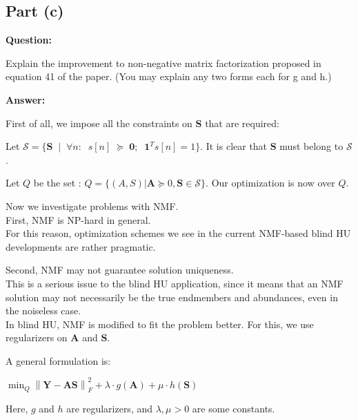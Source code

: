 \documentclass[fleqn, 11pt]{article}
\newcommand{\bs}[1]{\boldsymbol{#1}}
\newcommand\norm[1]{\left\lVert#1\right\rVert}
\begin{document}
\bigskip


\subsection*{Part (c)}

\textbf{Question:}

\smallskip

Explain the improvement to non-negative matrix factorization proposed in equation 41 of the paper.
(You may explain any two forms each for g and h.)

\hrulefill

\medskip

\textbf{Answer:}

\smallskip

First of all, we impose all the constraints on $\bs{S}$ that are required:

Let $\mathcal{S}=\{ \bs{S} \;\; | \;\; \forall n:  \;\; s[n] \; \succeq \; \bs{0} ;  \;\; \bs{1}^Ts[n]=1 \}$. 
It is clear that $\bs{S}$ must belong to $\mathcal{S}$. 

\medskip

Let $Q$ be the set : $Q = \{ (A,S) |  \bs{A} \succeq {0}, \bs{S} \in \mathcal{S}\}$.
Our optimization is now over $Q$. 

\medskip

Now we investigate problems with NMF. \\

First, NMF is NP-hard in general. \\
For this reason, optimization schemes we see in the current NMF-based blind HU developments are rather pragmatic.

Second, NMF may not guarantee solution uniqueness. \\
This is a serious issue to the blind HU application, since it means that an NMF solution may not necessarily be the true endmembers and abundances, even in the noiseless case. \\

In blind HU, NMF is modified to fit the problem better. For this, we use regularizers on $\bs{A}$ and $\bs{S}$.

\medskip

A general formulation is: 
\begin{center}
    $\displaystyle \min_{Q} \norm{\bs{Y-AS}}^2_F
    + \lambda \cdot g(\bs{A}) 
    + \mu \cdot h(\bs{S})$
\end{center}

Here, $g$ and $h$ are regularizers, and $\lambda , \mu > 0$  are some constants. \\
\end{document}
